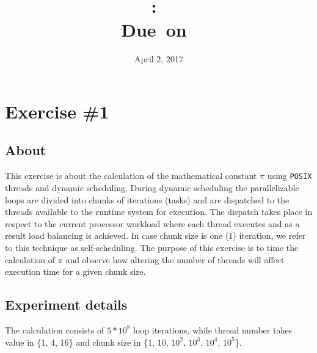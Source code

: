 \documentclass{article}
\title{
\vspace{2in}
\textmd{\textbf{\hmwkClass:\ \hmwkTitle}}\\
\normalsize\vspace{0.1in}\small{Due\ on\ \hmwkDueDate}\\
\vspace{0.1in}\large{\textit{\hmwkClassInstructor}}
\vspace{3in}
}
\author{\textbf{\hmwkAuthorName}}
\date{April 2, 2017} %
\begin{document}
\maketitle


\newpage
\tableofcontents
\newpage



\section{Exercise \#1}

\subsection{About}
This exercise is about the calculation of the mathematical constant $\pi$ using \texttt{POSIX}
threads and dynamic scheduling. During dynamic scheduling the parallelizable loops are divided
into chunks of iterations (tasks) and are dispatched to the threads available to the runtime
system for execution. The dispatch takes place in respect to the current processor workload
where each thread executes and as a result load balancing is achieved. In case chunk size is
one ($1$) iteration, we refer to this technique as self-scheduling. The purpose of this
exercise is to time the calculation of $\pi$ and observe how altering the number of threads
will affect execution time for a given chunk size.

\subsection{Experiment details}
The calculation consists of $5*10^8$ loop iterations, while thread number takes value in \{1, 4, 16\} and
chunk size in \{1, 10, $10^2$, $10^3$, $10^4$, $10^5$\}.
\end{document}
